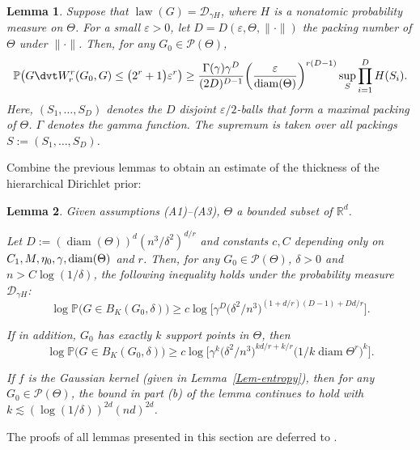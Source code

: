 \documentclass[MSNbibl,number,citesort]{arxbj}
\newtheorem{lemma}{Lemma}[section]
\newcommand{\real}{\mathbb{R}}
\newcommand{\Dcal}{\mathcal{D}}
\newcommand{\Pcal}{\mathscr{P}}
\newcommand{\Prob}{\mathbb{P}}
\newcommand{\Diam}{\operatorname{diam}}
\newcommand{\DP}{\mathscr{D}}
\newcommand{\law}{\operatorname{law}}
\newcommand{\Wr}{W_r}
\newcommand{\Gz}{G_0}
\newcommand{\Bky}{B_K}
\begin{document}
%
\begin{lemma}
\label{Lem-DP-lowerbound}
Suppose that $\law(G) = \DP_{\gamma H}$, where $H$ is a nonatomic probability
measure on $\Theta$. For a small $\varepsilon> 0$, let $D =
D(\varepsilon
,\Theta,\|\cdot\|)$
the packing number of $\Theta$ under $\|\cdot\|$. Then, for any $\Gz
\in\Pcal(\Theta)$,
%
\[
\Prob \bigl(G\dvt\Wr^r(G_0,G) \leq \bigl(2^r
+ 1 \bigr)\varepsilon^r \bigr) \geq\frac{\Gamma(\gamma) \gamma
^{D}}{(2D)^{D-1}} \biggl(
\frac{\varepsilon}{\operatorname{diam}(\Theta)} \biggr)^{r(D-1)} \sup_{S} \prod
_{i=1}^{D} H(S_i).
\]
%
Here, $(S_1,\ldots, S_D)$ denotes the $D$ disjoint $\varepsilon/2$-balls
that form
a maximal packing of $\Theta$.
$\Gamma$ denotes the gamma function. The
supremum is taken over all packings $S:= (S_1,\ldots, S_D)$.
\end{lemma}

Combine the previous lemmas to obtain an estimate of the thickness
of the hierarchical Dirichlet prior:

%
\begin{lemma}
\label{Thm-KL}
Given assumptions \textup{(A1)--(A3)}, $\Theta$ a bounded subset of $\real^d$.
%
\begin{longlist}[(a)]
%
\item[(a)] Let $D := (\Diam(\Theta))^d (n^3/\delta^2)^{d/r}$
and constants $c, C$ depending only on $C_1, M, \eta_0, \gamma,\break
\operatorname{diam}(\Theta)$ and $r$. Then,
for any $G_0 \in\Pcal(\Theta)$,
$\delta> 0$ and $n > C\log(1/\delta)$, the following
inequality holds under the probability measure $\Dcal_{\gamma H}$:
%
\[
\log\Prob \bigl(G \in\Bky(\Gz,\delta) \bigr) \geq c \log \bigl[
\gamma^D \bigl(\delta^2/n^3
\bigr)^{(1+d/r)(D-1) + Dd/r} \bigr].
\]
%
\item[(b)] If in addition, $G_0$ has exactly $k$ support points in
$\Theta$,
then
%
\[
\log\Prob \bigl(G \in\Bky(\Gz,\delta) \bigr) \geq c \log \bigl[
\gamma^k \bigl(\delta^2/n^3
\bigr)^{kd/r + k/r} \bigl(1/k\operatorname{diam}\Theta^r
\bigr)^{k} \bigr].
\]
%
\item[(c)] If $f$ is the Gaussian kernel (given in Lemma~\ref{Lem-entropy}),
then for any $G_0 \in\Pcal(\Theta)$, the bound in part \textup{(b)} of the lemma
continues to hold with $k \lesssim(\log(1/\delta))^{2d}(nd)^{2d}$.
\end{longlist}
%
\end{lemma}

The proofs of all lemmas presented in this section are
deferred to %
\cite{Nguyen-hdpsupp}.
\end{document}
